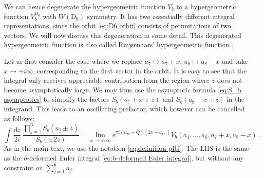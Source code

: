 \documentclass[12pt,a4paper]{article}
\newcommand{\be}{\begin{equation}}
\newcommand{\ee}{\end{equation}}
\renewcommand\d{\text{d}}
\begin{document}
We can hence degenerate the hypergeometric function $V_b$ to a hypergeometric function $V_b^{\mathrm{D}_6}$ with $W(\mathrm{D}_6)$ symmetry. It has two essentially different integral representations, since the orbit \eqref{eq:D6 orbit} consists of permutations of two vectors. We will now discuss this degeneration in some detail. This degenerated hypergeometric function is also called Ruijsenaars' hypergeometric function \cite{Ruijsenaars1, Ruijsenaars2}.

Let us first consider the case where we replace $a_7 \mapsto a_7+x$, $a_8 \mapsto a_8 -x$ and take $x \to +i \infty$, corresponding to the first vector in the orbit. It is easy to see that the integral only receives appreciable contribution from the region where $z$ does not become asymptotically large. We may thus use the asymptotic formula \eqref{eq:S_b asymptotics} to simplify the factors $S_b(a_7+x \pm z)$ and $S_b(a_8-x \pm z)$ in the integrand. This leads to an oscillating prefactor, which however can be cancelled as follows:
\be 
\int \frac{\d z}{2i}\  \frac{\prod_{j=1}^6 S_b(a_j \pm z)}{S_b(\pm 2z)}=\lim_{x \to +i \infty} \mathrm{e}^{\pi i (a_{78}-Q)(2x+a_{7|8})} V_b(a_1,\dots,a_6,a_7+x,a_8-x)\ .
\label{eq:hypergeometric function D6 degeneration symmetric}
\ee
As in the main text, we use the notation \eqref{eq:definition pI|J}.
The LHS is the same as the $b$-deformed Euler integral \eqref{eq:b-deformed Euler integral}, but without any constraint on $\sum_{j=1}^6 a_j$.
\end{document}
